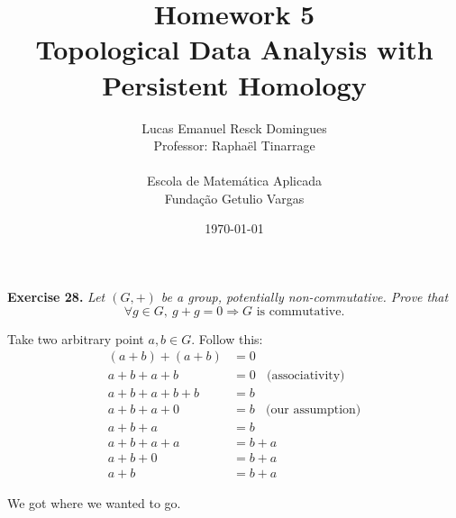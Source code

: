 \documentclass{article}
\title{Homework 5\\
    \large{Topological Data Analysis with Persistent Homology}}
\author{Lucas Emanuel Resck Domingues\\    
    Professor: Raphaël Tinarrage\\\\
    {Escola de Matemática Aplicada}\\
    {Fundação Getulio Vargas}}
\date{\today}
\begin{document}
    \maketitle

    \noindent \textbf{Exercise 28.} \textit{Let $(G, +)$ be a group, potentially non-commutative.
    Prove that
    $$\forall g \in G,\ g + g = 0 \Longrightarrow \textrm{$G$ is commutative.}$$}

    Take two arbitrary point $a, b \in G$.
    Follow this:
    \begin{align*}
        (a + b) + (a + b) &= 0 \\
        a + b + a + b &= 0 \ \ \ \ \textrm{(associativity)}\\
        a + b + a + b + b &= b \\
        a + b + a + 0 &= b \ \ \ \ \textrm{(our assumption)}\\
        a + b + a &= b \ \ \\
        a + b + a + a &= b + a \\
        a + b + 0 &= b + a \\
        a + b &= b + a
    \end{align*}

    We got where we wanted to go.    
\end{document}
